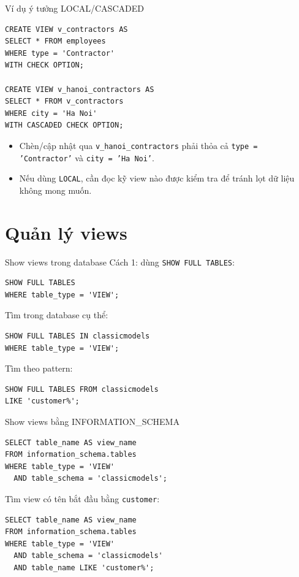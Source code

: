 \documentclass[aspectratio=169,11pt]{beamer}
\begin{document}
\begin{frame}[fragile]{Ví dụ ý tưởng LOCAL/CASCADED}
\begin{lstlisting}
CREATE VIEW v_contractors AS
SELECT * FROM employees
WHERE type = 'Contractor'
WITH CHECK OPTION;

CREATE VIEW v_hanoi_contractors AS
SELECT * FROM v_contractors
WHERE city = 'Ha Noi'
WITH CASCADED CHECK OPTION;
\end{lstlisting}

\begin{itemize}
    \item Chèn/cập nhật qua \texttt{v\_hanoi\_contractors} phải thỏa cả \texttt{type = 'Contractor'} và \texttt{city = 'Ha Noi'}.
    \item Nếu dùng \texttt{LOCAL}, cần đọc kỹ view nào được kiểm tra để tránh lọt dữ liệu không mong muốn.
\end{itemize}
\end{frame}

\section{Quản lý views}

\begin{frame}[fragile]{Show views trong database}
Cách 1: dùng \texttt{SHOW FULL TABLES}:
\begin{lstlisting}
SHOW FULL TABLES
WHERE table_type = 'VIEW';
\end{lstlisting}

Tìm trong database cụ thể:
\begin{lstlisting}
SHOW FULL TABLES IN classicmodels
WHERE table_type = 'VIEW';
\end{lstlisting}

Tìm theo pattern:
\begin{lstlisting}
SHOW FULL TABLES FROM classicmodels
LIKE 'customer%';
\end{lstlisting}
\end{frame}

\begin{frame}[fragile]{Show views bằng INFORMATION\_SCHEMA}
\begin{lstlisting}
SELECT table_name AS view_name
FROM information_schema.tables
WHERE table_type = 'VIEW'
  AND table_schema = 'classicmodels';
\end{lstlisting}

Tìm view có tên bắt đầu bằng \texttt{customer}:
\begin{lstlisting}
SELECT table_name AS view_name
FROM information_schema.tables
WHERE table_type = 'VIEW'
  AND table_schema = 'classicmodels'
  AND table_name LIKE 'customer%';
\end{lstlisting}
\end{frame}
\end{document}
